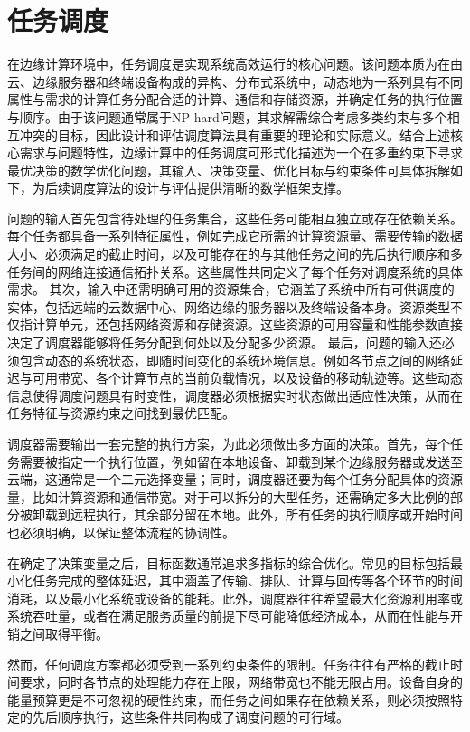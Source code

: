 \section{任务调度}
在边缘计算环境中，任务调度是实现系统高效运行的核心问题。该问题本质为在由云、边缘服务器和终端设备构成的异构、分布式系统中，动态地为一系列具有不同属性与需求的计算任务分配合适的计算、通信和存储资源，并确定任务的执行位置与顺序。由于该问题通常属于NP-hard问题\cite{10068185,8758310}，其求解需综合考虑多类约束与多个相互冲突的目标，因此设计和评估调度算法具有重要的理论和实际意义。结合上述核心需求与问题特性，边缘计算中的任务调度可形式化描述为一个在多重约束下寻求最优决策的数学优化问题，其输入、决策变量、优化目标与约束条件可具体拆解如下，为后续调度算法的设计与评估提供清晰的数学框架支撑。

问题的输入首先包含待处理的任务集合，这些任务可能相互独立或存在依赖关系。每个任务都具备一系列特征属性，例如完成它所需的计算资源量、需要传输的数据大小、必须满足的截止时间，以及可能存在的与其他任务之间的先后执行顺序和多任务间的网络连接通信拓扑关系。这些属性共同定义了每个任务对调度系统的具体需求。
其次，输入中还需明确可用的资源集合，它涵盖了系统中所有可供调度的实体，包括远端的云数据中心、网络边缘的服务器以及终端设备本身。资源类型不仅指计算单元，还包括网络资源和存储资源。这些资源的可用容量和性能参数直接决定了调度器能够将任务分配到何处以及分配多少资源。
最后，问题的输入还必须包含动态的系统状态，即随时间变化的系统环境信息。例如各节点之间的网络延迟与可用带宽、各个计算节点的当前负载情况，以及设备的移动轨迹等。这些动态信息使得调度问题具有时变性，调度器必须根据实时状态做出适应性决策，从而在任务特征与资源约束之间找到最优匹配。

调度器需要输出一套完整的执行方案，为此必须做出多方面的决策。首先，每个任务需要被指定一个执行位置，例如留在本地设备、卸载到某个边缘服务器或发送至云端，这通常是一个二元选择变量；同时，调度器还要为每个任务分配具体的资源量，比如计算资源和通信带宽。对于可以拆分的大型任务，还需确定多大比例的部分被卸载到远程执行，其余部分留在本地。此外，所有任务的执行顺序或开始时间也必须明确，以保证整体流程的协调性。

在确定了决策变量之后，目标函数通常追求多指标的综合优化。常见的目标包括最小化任务完成的整体延迟，其中涵盖了传输、排队、计算与回传等各个环节的时间消耗，以及最小化系统或设备的能耗。此外，调度器往往希望最大化资源利用率或系统吞吐量，或者在满足服务质量的前提下尽可能降低经济成本，从而在性能与开销之间取得平衡。

然而，任何调度方案都必须受到一系列约束条件的限制。任务往往有严格的截止时间要求，同时各节点的处理能力存在上限，网络带宽也不能无限占用。设备自身的能量预算更是不可忽视的硬性约束，而任务之间如果存在依赖关系，则必须按照特定的先后顺序执行，这些条件共同构成了调度问题的可行域。

